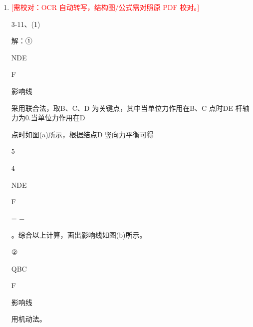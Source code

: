 \documentclass[UTF8,12pt,a4paper,openany]{ctexbook}
\newcommand{\TODO}[1]{\textcolor{red}{[需校对：#1]}}
\begin{document}
\begin{enumerate}[label=\textbf{\arabic*.},leftmargin=2em]
\item \TODO{OCR 自动转写，结构图/公式需对照原 PDF 校对。}\par 3-11、(1)\par 解：①\par NDE\par F\par 影响线\par 采用联合法，取B、C、D 为关键点，其中当单位力作用在B、C 点时DE 杆轴力为0.当单位力作用在D\par 点时如图(a)所示，根据结点D 竖向力平衡可得\par 5\par 4\par NDE\par F\par = −\par 。综合以上计算，画出影响线如图(b)所示。\par ②\par QBC\par F\par 影响线\par 用机动法。
\end{enumerate}
\end{document}
